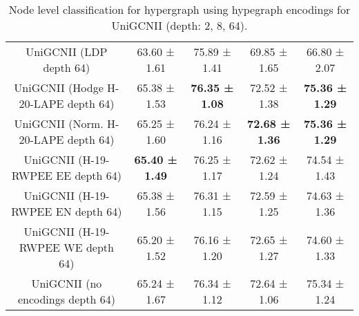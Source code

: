 \begin{table}[H]
\begin{tabular}{|c|c|c|c|c|}
UniGCNII (LDP depth 64) & 63.60 ± 1.61 & 75.89 ± 1.41 & 69.85 ± 1.65 & 66.80 ± 2.07 \\
UniGCNII (Hodge H-20-LAPE depth 64) & 65.38 ± 1.53 & \textbf{76.35 ± 1.08} & 72.52 ± 1.38 & \textbf{75.36 ± 1.29} \\
UniGCNII (Norm. H-20-LAPE depth 64) & 65.25 ± 1.60 & 76.24 ± 1.16 & \textbf{72.68 ± 1.36} & \textbf{75.36 ± 1.29} \\
UniGCNII (H-19-RWPEE EE depth 64) & \textbf{65.40 ± 1.49} & 76.25 ± 1.17 & 72.62 ± 1.24 & 74.54 ± 1.43 \\
UniGCNII (H-19-RWPEE EN depth 64) & 65.38 ± 1.56 & 76.31 ± 1.15 & 72.59 ± 1.25 & 74.63 ± 1.36 \\
UniGCNII (H-19-RWPEE WE depth 64) & 65.20 ± 1.52 & 76.16 ± 1.20 & 72.65 ± 1.27 & 74.60 ± 1.33 \\
\hline
UniGCNII (no encodings depth 64) & 65.24 ± 1.67 & 76.34 ± 1.12 & 72.64 ± 1.06 & 75.34 ± 1.24 \\
\hline
\end{tabular}
\caption{Node level classification for hypergraph using hypegraph encodings for UniGCNII (depth: 2, 8, 64).}
\label{tab:hg_node_classification_UniGCNII}
\end{table}
